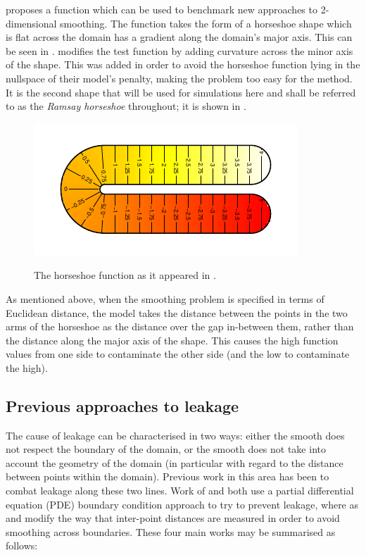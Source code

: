 \label{ramsayfunc}

 proposes a function which can be used to benchmark new approaches to 2-dimensional smoothing. The function takes the form of a horseshoe shape which is flat across the domain has a gradient along the domain's major axis. This can be seen in .  modifies the test function by adding curvature across the minor axis of the shape. This was added in order to avoid the horseshoe function lying in the nullspace of their model's penalty, making the problem too easy for the method. It is the second shape that will be used for simulations here and shall be referred to as the \emph{Ramsay horseshoe} throughout; it is shown in .

\begin{figure}
\centering
\includegraphics{intro/figs/orig-fs.pdf}\\
\caption{The horseshoe function as it appeared in .}
\label{orig-fs}
\end{figure}

As mentioned above, when the smoothing problem is specified in terms of Euclidean distance, the model takes the distance between the points in the two arms of the horseshoe as the distance over the gap in-between them, rather than the distance along the major axis of the shape. This causes the high function values from one side to contaminate the other side (and the low to contaminate the high).
		
\subsection{Previous approaches to leakage}
\label{intro-leakageapproaches}

The cause of leakage can be characterised in two ways: either the smooth does not respect the boundary of the domain, or the smooth does not take into account the geometry of the domain (in particular with regard to the distance between points within the domain). Previous work in this area has been to combat leakage along these two lines. Work of  and  both use a partial differential equation (PDE) boundary condition approach to try to prevent leakage, where as  and  modify the way that inter-point distances are measured in order to avoid smoothing across boundaries. These four main works may be summarised as follows:

